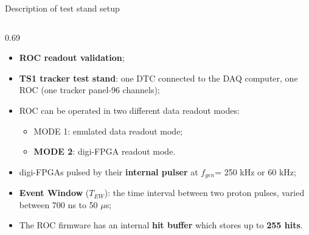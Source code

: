 \documentclass{beamer}
\begin{document}
 \begin{frame}{Description of test stand setup}
 \vspace{-3mm}
\begin{columns}
    \begin{column}{0.69\framewidth}
             \setlength{\leftmargini}{1.3em}
      \begin{itemize}
      \item \textbf{ROC readout validation};
      \vspace{1mm}
          \item \textbf{TS1 tracker test stand}: one DTC connected to the DAQ computer, one ROC (one tracker panel-96 channels);
             \vspace{1mm}
          \item ROC can be operated in two different data readout modes:
          \begin{itemize}
              \item MODE 1: emulated data readout mode;
              \item \textbf{MODE 2}: digi-FPGA readout mode.
          \end{itemize}
             \vspace{1mm}
          \item digi-FPGAs pulsed by their \textbf{internal pulser} at $f_{gen}$= 250 kHz or 60 kHz;
             \vspace{1mm}
          \item \textbf{Event Window} ($T_{EW}$): the time interval between two proton pulses, varied between 700 ns to 50 $\mu$s;
             \vspace{1mm}
          \item The ROC firmware has an internal \textbf{hit buffer} which stores up to \textbf{255 hits}.


\end{itemize}
\end{column}
\end{columns}
\end{frame}
\end{document}
